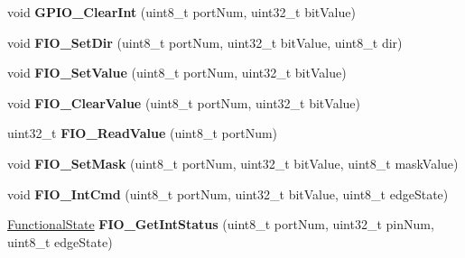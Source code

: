 \begin{DoxyCompactItemize}
\item 
\hypertarget{group___g_p_i_o___public___functions_gaf35289dfd8048cc2859858e18780e66a}{void {\bfseries \-G\-P\-I\-O\-\_\-\-Clear\-Int} (uint8\-\_\-t port\-Num, uint32\-\_\-t bit\-Value)}\label{group___g_p_i_o___public___functions_gaf35289dfd8048cc2859858e18780e66a}

\item 
\hypertarget{group___g_p_i_o___public___functions_ga8084f8294aeb3b58a6c9c2764108f653}{void {\bfseries \-F\-I\-O\-\_\-\-Set\-Dir} (uint8\-\_\-t port\-Num, uint32\-\_\-t bit\-Value, uint8\-\_\-t dir)}\label{group___g_p_i_o___public___functions_ga8084f8294aeb3b58a6c9c2764108f653}

\item 
\hypertarget{group___g_p_i_o___public___functions_gaf913440461933b1d07d3f0d764eb192a}{void {\bfseries \-F\-I\-O\-\_\-\-Set\-Value} (uint8\-\_\-t port\-Num, uint32\-\_\-t bit\-Value)}\label{group___g_p_i_o___public___functions_gaf913440461933b1d07d3f0d764eb192a}

\item 
\hypertarget{group___g_p_i_o___public___functions_ga5d2ece7e02e06da0ee5655aa7eb023f1}{void {\bfseries \-F\-I\-O\-\_\-\-Clear\-Value} (uint8\-\_\-t port\-Num, uint32\-\_\-t bit\-Value)}\label{group___g_p_i_o___public___functions_ga5d2ece7e02e06da0ee5655aa7eb023f1}

\item 
\hypertarget{group___g_p_i_o___public___functions_gae6292e92ddda24afbd600f2a843c9586}{uint32\-\_\-t {\bfseries \-F\-I\-O\-\_\-\-Read\-Value} (uint8\-\_\-t port\-Num)}\label{group___g_p_i_o___public___functions_gae6292e92ddda24afbd600f2a843c9586}

\item 
\hypertarget{group___g_p_i_o___public___functions_ga52db811bd6b4502cbd6e16cce2f28813}{void {\bfseries \-F\-I\-O\-\_\-\-Set\-Mask} (uint8\-\_\-t port\-Num, uint32\-\_\-t bit\-Value, uint8\-\_\-t mask\-Value)}\label{group___g_p_i_o___public___functions_ga52db811bd6b4502cbd6e16cce2f28813}

\item 
\hypertarget{group___g_p_i_o___public___functions_ga44e6390ad256eed34193a9ac7934ade7}{void {\bfseries \-F\-I\-O\-\_\-\-Int\-Cmd} (uint8\-\_\-t port\-Num, uint32\-\_\-t bit\-Value, uint8\-\_\-t edge\-State)}\label{group___g_p_i_o___public___functions_ga44e6390ad256eed34193a9ac7934ade7}

\item 
\hypertarget{group___g_p_i_o___public___functions_ga4b2bf89f04d8e679551714ff49502074}{\hyperlink{group___l_p_c___types___public___types_gac9a7e9a35d2513ec15c3b537aaa4fba1}{\-Functional\-State} {\bfseries \-F\-I\-O\-\_\-\-Get\-Int\-Status} (uint8\-\_\-t port\-Num, uint32\-\_\-t pin\-Num, uint8\-\_\-t edge\-State)}\label{group___g_p_i_o___public___functions_ga4b2bf89f04d8e679551714ff49502074}


\end{DoxyCompactItemize}
